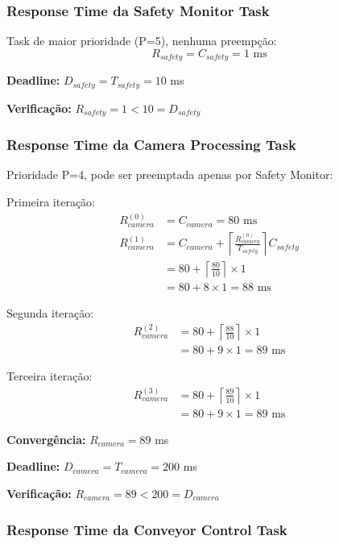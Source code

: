 \documentclass[12pt,a4paper]{article}
\begin{document}
\subsubsection{Response Time da Safety Monitor Task}

Task de maior prioridade (P=5), nenhuma preempção:
\begin{equation}
R_{safety} = C_{safety} = 1 \text{ ms}
\end{equation}

\textbf{Deadline:} $D_{safety} = T_{safety} = 10$ ms

\textbf{Verificação:} $R_{safety} = 1 < 10 = D_{safety}$ \checkmark

\subsubsection{Response Time da Camera Processing Task}

Prioridade P=4, pode ser preemptada apenas por Safety Monitor:

Primeira iteração:
\begin{align}
R_{camera}^{(0)} &= C_{camera} = 80 \text{ ms} \\
R_{camera}^{(1)} &= C_{camera} + \left\lceil \frac{R_{camera}^{(0)}}{T_{safety}} \right\rceil C_{safety} \\
&= 80 + \left\lceil \frac{80}{10} \right\rceil \times 1 \\
&= 80 + 8 \times 1 = 88 \text{ ms}
\end{align}

Segunda iteração:
\begin{align}
R_{camera}^{(2)} &= 80 + \left\lceil \frac{88}{10} \right\rceil \times 1 \\
&= 80 + 9 \times 1 = 89 \text{ ms}
\end{align}

Terceira iteração:
\begin{align}
R_{camera}^{(3)} &= 80 + \left\lceil \frac{89}{10} \right\rceil \times 1 \\
&= 80 + 9 \times 1 = 89 \text{ ms}
\end{align}

\textbf{Convergência:} $R_{camera} = 89$ ms

\textbf{Deadline:} $D_{camera} = T_{camera} = 200$ ms

\textbf{Verificação:} $R_{camera} = 89 < 200 = D_{camera}$ \checkmark

\subsubsection{Response Time da Conveyor Control Task}
\end{document}

